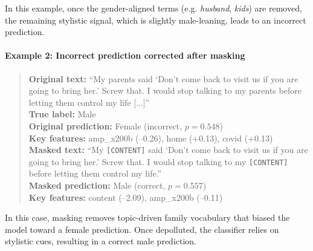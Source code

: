 \documentclass[11pt]{article}
\begin{document}
In this example, once the gender-aligned terms (e.g. \emph{husband}, \emph{kids}) are removed, the remaining stylistic signal, which is slightly male-leaning, leads to an incorrect prediction.

\paragraph{Example 2: Incorrect prediction corrected after masking}
\begin{quote}
\small
\textbf{Original text:} ``My parents said ‘Don’t come back to visit us if you are
going to bring her.’ Screw that. I would stop talking to my parents before letting
them control my life [...]'' \\
\textbf{True label:} Male \\
\textbf{Original prediction:} Female (incorrect, $p=0.548$) \\
\textbf{Key features:} amp\_x200b (–0.26), home (+0.13), covid (+0.13) \\
\textbf{Masked text:} ``My \texttt{[CONTENT]} said ‘Don’t come back to visit us if
you are going to bring her.’ Screw that. I would stop talking to my
\texttt{[CONTENT]} before letting them control my life.'' \\
\textbf{Masked prediction:} Male (correct, $p=0.557$) \\
\textbf{Key features:} content (–2.09), amp\_x200b (–0.11)
\end{quote}

In this case, masking removes topic-driven family vocabulary that biased the model toward a female prediction. Once depolluted, the classifier relies on stylistic cues, resulting in a correct male prediction.


\end{document}
